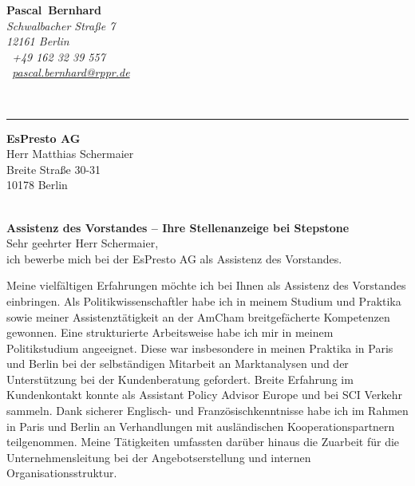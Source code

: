 \documentclass[11pt,a4paper]{article}
\def\firstname{Pascal}
\def\familyname{Bernhard}
\begin{document}
\sffamily   %
\hfill%
\begin{minipage}[t]{.6\textwidth}
	\raggedleft%
	{\bfseries {\color{firstnamecolor}\firstname}~{\color{familynamecolor}\familyname}}\\[.35ex]
	\small\itshape%
	Schwalbacher Straße 7\\
	12161 Berlin\\[.35ex]
	\Mobilefone~+49 162 32 39 557 \\
	\Letter~\href{mailto:pascal.bernhard@rppr.de}{pascal.bernhard@rppr.de}
\end{minipage}\\[0.5em]
%
{\color{firstnamecolor}\rule{\textwidth}{.25ex}}
%
\begin{minipage}[t]{.4\textwidth}
	\raggedright%
	\vspace*{1em}
	\textbf{EsPresto AG} \\
	Herr Matthias Schermaier \\[.35ex]
	\small%
	Breite Straße 30-31\\
	10178 Berlin
\end{minipage}
%
\hfill
%
\begin{minipage}[t]{.4\textwidth}
	\raggedleft %
\end{minipage}\\[1em]


{\bfseries \color{familynamecolor}Assistenz des Vorstandes -- Ihre Stellenanzeige bei Stepstone}\\[0.75em]

Sehr geehrter Herr Schermaier,\\[0.5em]
%
ich bewerbe mich bei der EsPresto AG als Assistenz des Vorstandes.

Meine vielfältigen Erfahrungen möchte ich bei Ihnen als Assistenz des Vorstandes einbringen. Als Politikwissenschaftler habe ich in meinem Studium und Praktika sowie meiner Assistenztätigkeit an der AmCham breitgefächerte Kompetenzen gewonnen. Eine strukturierte Arbeitsweise habe ich mir in meinem Politikstudium angeeignet. Diese war insbesondere in meinen Praktika in Paris und Berlin bei der selbständigen Mitarbeit an Marktanalysen und der Unterstützung bei der Kundenberatung gefordert. Breite Erfahrung im Kundenkontakt konnte als Assistant Policy Advisor Europe und bei SCI Verkehr sammeln. Dank sicherer Englisch- und Französischkenntnisse habe ich im Rahmen in Paris und Berlin an Verhandlungen mit ausländischen Kooperationspartnern teilgenommen. Meine Tätigkeiten umfassten darüber hinaus die Zuarbeit für die Unternehmensleitung bei der Angebotserstellung und internen Organisationsstruktur.
\end{document}
